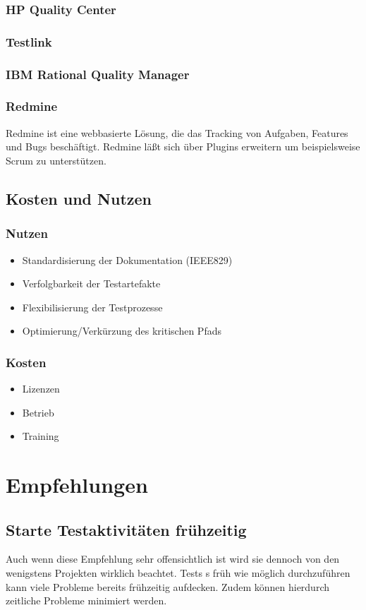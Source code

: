 \subsection{HP Quality Center}
\subsection{Testlink}
\subsection{IBM Rational Quality Manager}
\subsection{Redmine}
Redmine ist eine webbasierte L\"osung, die das Tracking von Aufgaben, Features und Bugs besch\"aftigt. Redmine l\"aßt sich \"uber Plugins erweitern um beispielsweise Scrum zu unterst\"utzen.

\section{Kosten und Nutzen}
\subsection{Nutzen}
\begin{itemize}
	\item Standardisierung der Dokumentation (IEEE829)
	\item Verfolgbarkeit der Testartefakte
	\item Flexibilisierung der Testprozesse
	\item Optimierung/Verkürzung des kritischen Pfads
\end{itemize}
\subsection{Kosten}
\begin{itemize}
	\item Lizenzen
	\item Betrieb
	\item Training
\end{itemize}

\chapter{Empfehlungen}
\section{Starte Testaktivit\"aten fr\"uhzeitig}
Auch wenn diese Empfehlung sehr offensichtlich ist wird sie dennoch von den wenigstens Projekten wirklich beachtet. Tests s fr\"uh wie m\"oglich durchzuf\"uhren kann viele Probleme bereits fr\"uhzeitig aufdecken. Zudem k\"onnen hierdurch zeitliche Probleme minimiert werden.

